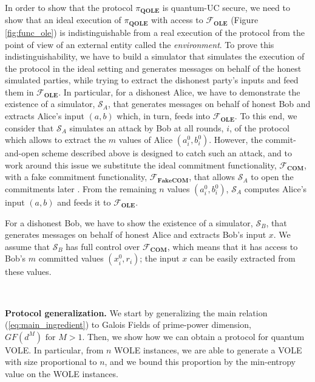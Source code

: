 In order to show that the protocol $\pi_{\textbf{QOLE}}$ is quantum-UC secure, we need to show that an ideal execution of $\pi_{\textbf{QOLE}}$ with access to $\mathcal{F}_{\textbf{OLE}}$ (Figure \ref{fig:func_ole}) is indistinguishable from a real execution of the protocol from the point of view of an external entity called the \textit{environment}. To prove this indistinguishability, we have to build a simulator that simulates the execution of the protocol in the ideal setting and generates messages on behalf of the honest simulated parties,  while trying to extract the dishonest party's inputs and feed them in $\mathcal{F}_{\textbf{OLE}}$. In particular, for a dishonest Alice, we have to demonstrate the existence of a simulator, $\mathcal{S}_A$, that generates messages on behalf of honest Bob and extracts Alice's input $(a,b)$ which, in turn, feeds into $\mathcal{F}_{\textbf{OLE}}$.  To this end, we consider that $\mathcal{S}_A$ simulates an attack by Bob at all rounds, $i$, of the protocol  which allows to extract the $m$ values of Alice  $(a^0_i,b^0_i)$. However, the commit-and-open scheme described above is designed to catch such an attack, and to work around this issue we substitute the ideal commitment functionality, $\mathcal{F}_{\textbf{COM}}$, with a fake commitment functionality, $\mathcal{F}_{\textbf{FakeCOM}}$, that allows $\mathcal{S}_A$ to open the commitments later \cite{Unruh10}.  From the remaining $n$ values $(a^0_i,b^0_i)$, $\mathcal{S}_A$ computes Alice's input $(a,b)$ and feeds it to $\mathcal{F}_{\textbf{OLE}}$.

For a dishonest Bob, we have to show the existence of a simulator, $\mathcal{S}_B$, that generates messages on behalf of  honest Alice and extracts Bob's input $x$. We assume that $\mathcal{S}_B$ has full control over  $\mathcal{F}_{\textbf{COM}}$, which means that it has access to Bob's $m$ committed values $(x^0_i, r_i)$;  the input $x$ can be easily extracted from these values. %

\

\noindent\textbf{Protocol generalization.}  We start by generalizing   the main relation (\ref{eq:main_ingredient}) to Galois Fields of prime-power dimension, $GF(d^M) \text{ for }M>1$. Then, we show how we can obtain a protocol for quantum VOLE. In particular, from $n$ WOLE instances, we are able to generate a VOLE with size proportional to $n$, and we  bound this proportion by the min-entropy value on the WOLE instances.


